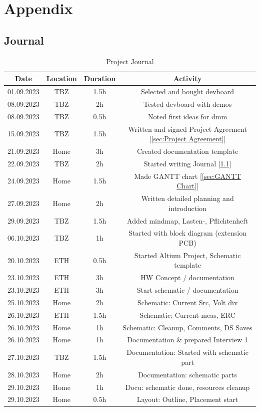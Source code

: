\chapter{Appendix}\label{cha:Appendix}

\section{Journal}\label{sec:Journal}
\begin{table}[H]
    \centering
    
\begin{tabular}{||c | c | c || c||} 
 \hline
 Date &  Location & Duration & Activity \\ [0.5ex] 
 \hline\hline
  01.09.2023 & TBZ & 1.5h & Selected and bought \acs{devboard} \\ 
 \hline
 08.09.2023 & TBZ & 2h & Tested \acs{devboard} with demos \\ 
 \hline
  08.09.2023 & TBZ & 0.5h & Noted first ideas for \acs{dmm} \\ 
 \hline
   15.09.2023 & TBZ & 1.5h & Written and signed Project Agreement [\ref{sec:Project Agreement}] \\ 
 \hline
    21.09.2023 & Home & 3h & Created documentation template \\ 
 \hline
    22.09.2023 & TBZ & 2h &  Started writing Journal [\ref{sec:Journal}]\\ 
 \hline
    24.09.2023 & Home & 1.5h &  Made GANTT chart [\ref{sec:GANTT Chart}]\\ 
 \hline
    27.09.2023 & Home & 2h & Written detailed planning and introduction \\ 
 \hline
    29.09.2023 & TBZ & 1.5h & Added mindmap, Lasten-, Pflichtenheft \\ 
 \hline
    06.10.2023 & TBZ & 1h & Started with block diagram (extension PCB) \\ 
 \hline
    20.10.2023 & ETH & 0.5h & Started Altium Project, Schematic template \\ 
 \hline
    23.10.2023 & ETH & 3h & HW Concept / documentation \\ 
 \hline
   23.10.2023 & ETH & 3h & Start schematic / documentation \\ 
 \hline
   25.10.2023 & Home & 2h & Schematic: Current Src, Volt div \\ 
 \hline
   26.10.2023 & ETH & 1.5h & Schematic: Current meas, ERC \\ 
 \hline
   26.10.2023 & Home & 1h & Schematic: Cleanup, Comments, DS Saves \\ 
 \hline
   26.10.2023 & Home & 1h & Documentation \& prepared Interview 1 \\ 
 \hline
  27.10.2023 & TBZ & 1.5h & Documentation: Started with schematic part \\ 
 \hline
  28.10.2023 & Home & 2h & Documentation: schematic parts \\ 
 \hline
  29.10.2023 & Home & 1h & Docu: schematic done, resources cleanup \\ 
 \hline
   29.10.2023 & Home & 0.5h & Layout: Outline, Placement start \\ 
 \hline
\end{tabular}
    \caption{Project Journal}\label{tab:Project Journal}
\end{table}
